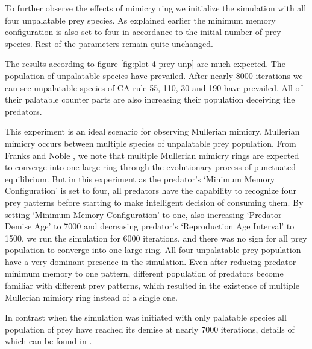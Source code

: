 \documentclass[letterpaper]{article}
\numberwithin{equation}{section}
\begin{document}
To further observe the effects of mimicry ring we initialize the simulation with all four unpalatable prey species. As explained earlier the minimum memory configuration is also set to four in accordance to the initial number of prey species. Rest of the parameters remain quite unchanged.

The results according to figure \ref{fig:plot-4-prey-unp} are much expected. The population of unpalatable species have prevailed. After nearly 8000 iterations we can see unpalatable species of CA rule 55, 110, 30 and 190 have prevailed. All of their palatable counter parts are also increasing their population deceiving the predators. 

This experiment is an ideal scenario for observing Mullerian mimicry. Mullerian mimicry occurs between multiple species of unpalatable prey population. From Franks and Noble \citep{franks2003}, we note that multiple Mullerian mimicry rings are expected to converge into one large ring through the evolutionary process of punctuated equilibrium. But in this experiment as the predator's `Minimum Memory Configuration' is set to four, all predators have the capability to recognize four prey patterns before starting to make intelligent decision of consuming them. By setting `Minimum Memory Configuration' to one, also increasing `Predator Demise Age' to 7000 and decreasing predator's `Reproduction Age Interval' to 1500, we run the simulation for 6000 iterations, and there was no sign for all prey population to converge into one large ring. All four unpalatable prey population have a very dominant presence in the simulation. Even after reducing predator minimum memory to one pattern, different population of predators become familiar with different prey patterns, which resulted in the existence of multiple Mullerian mimicry ring instead of a single one.

In contrast when the simulation was initiated with only palatable species all population of prey have reached its demise at nearly 7000 iterations, details of which can be found in \citep{mohiulThesis2011}.
\end{document}

